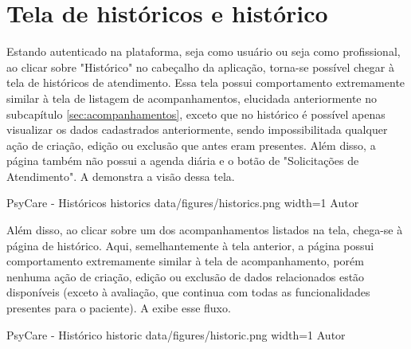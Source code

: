 \section{Tela de históricos e histórico}
\label{sec:historicos}

Estando autenticado na plataforma, seja como usuário ou seja como profissional, ao clicar sobre "Histórico" no cabeçalho da aplicação, torna-se possível chegar à tela de históricos de atendimento. Essa tela possui comportamento extremamente similar à tela de listagem de acompanhamentos, elucidada anteriormente no subcapítulo \ref{sec:acompanhamentos}, exceto que no histórico é possível apenas visualizar os dados cadastrados anteriormente, sendo impossibilitada qualquer ação de criação, edição ou exclusão que antes eram presentes. Além disso, a página também não possui a agenda diária e o botão de "Solicitações de Atendimento". A  demonstra a visão dessa tela.

\image
    {PsyCare - Históricos}
    {historics}
    {data/figures/historics.png}
    {width=1\textwidth}
    {Autor}

Além disso, ao clicar sobre um dos acompanhamentos listados na tela, chega-se à página de histórico. Aqui, semelhantemente à tela anterior, a página possui comportamento extremamente similar à tela de acompanhamento, porém nenhuma ação de criação, edição ou exclusão de dados relacionados estão disponíveis (exceto à avaliação, que continua com todas as funcionalidades presentes para o paciente). A  exibe esse fluxo.

\image
    {PsyCare - Histórico}
    {historic}
    {data/figures/historic.png}
    {width=1\textwidth}
    {Autor}